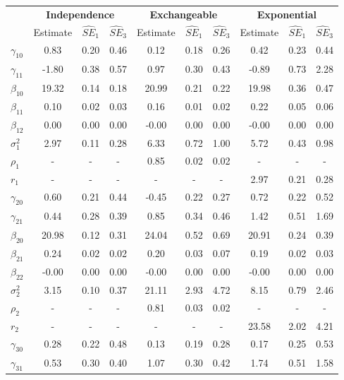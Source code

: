 \begin{table}[ht]
\centering
\begin{tabular}{lccccccccc}
  \thickhline&\multicolumn{3}{c}{\textbf{Independence}}&\multicolumn{3}{c}{\textbf{Exchangeable}}&\multicolumn{3}{c}{\textbf{Exponential}}\\&Estimate&$\widehat{SE}_1$&$\widehat{SE}_3$&Estimate&$\widehat{SE}_1$&$\widehat{SE}_3$&Estimate&$\widehat{SE}_1$&$\widehat{SE}_3$\\\hline $\gamma_{10}$ & 0.83 & 0.20 & 0.46 & 0.12 & 0.18 & 0.26 & 0.42 & 0.23 & 0.44 \\ 
  $\gamma_{11}$ & -1.80 & 0.38 & 0.57 & 0.97 & 0.30 & 0.43 & -0.89 & 0.73 & 2.28 \\ 
  $\beta_{10}$ & 19.32 & 0.14 & 0.18 & 20.99 & 0.21 & 0.22 & 19.98 & 0.36 & 0.47 \\ 
  $\beta_{11}$ & 0.10 & 0.02 & 0.03 & 0.16 & 0.01 & 0.02 & 0.22 & 0.05 & 0.06 \\ 
  $\beta_{12}$ & 0.00 & 0.00 & 0.00 & -0.00 & 0.00 & 0.00 & -0.00 & 0.00 & 0.00 \\ 
  $\sigma_1^2$ & 2.97 & 0.11 & 0.28 & 6.33 & 0.72 & 1.00 & 5.72 & 0.43 & 0.98 \\ 
  $\rho_1$ & - & - & - & 0.85 & 0.02 & 0.02 & - & - & - \\ 
  $r_1$ & - & - & - & - & - & - & 2.97 & 0.21 & 0.28 \\ 
  $\gamma_{20}$ & 0.60 & 0.21 & 0.44 & -0.45 & 0.22 & 0.27 & 0.72 & 0.22 & 0.52 \\ 
  $\gamma_{21}$ & 0.44 & 0.28 & 0.39 & 0.85 & 0.34 & 0.46 & 1.42 & 0.51 & 1.69 \\ 
  $\beta_{20}$ & 20.98 & 0.12 & 0.31 & 24.04 & 0.52 & 0.69 & 20.91 & 0.24 & 0.39 \\ 
  $\beta_{21}$ & 0.24 & 0.02 & 0.02 & 0.20 & 0.03 & 0.07 & 0.19 & 0.02 & 0.03 \\ 
  $\beta_{22}$ & -0.00 & 0.00 & 0.00 & -0.00 & 0.00 & 0.00 & -0.00 & 0.00 & 0.00 \\ 
  $\sigma_2^2$ & 3.15 & 0.10 & 0.37 & 21.11 & 2.93 & 4.72 & 8.15 & 0.79 & 2.46 \\ 
  $\rho_2$ & - & - & - & 0.81 & 0.03 & 0.02 & - & - & - \\ 
  $r_2$ & - & - & - & - & - & - & 23.58 & 2.02 & 4.21 \\ 
  $\gamma_{30}$ & 0.28 & 0.22 & 0.48 & 0.13 & 0.19 & 0.28 & 0.17 & 0.25 & 0.53 \\ 
  $\gamma_{31}$ & 0.53 & 0.30 & 0.40 & 1.07 & 0.30 & 0.42 & 1.74 & 0.51 & 1.58 \\ 

\end{tabular}
\end{table}
